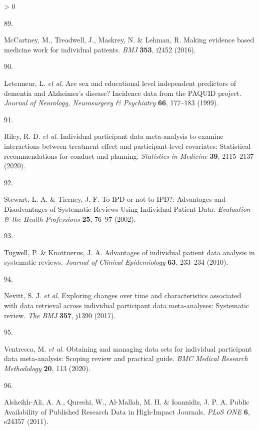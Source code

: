 \documentclass[a4paper, twoside]{templates/ociamthesis}
\newlength{\cslhangindent}
\newlength{\csllabelwidth}
\newenvironment{CSLReferences}[3] %
 {%
  \setlength{\parindent}{0pt}
  \ifodd #1 \everypar{\setlength{\hangindent}{\cslhangindent}}\ignorespaces\fi
  \ifnum #2 > 0
  \setlength{\parskip}{#2\baselineskip}
  \fi
 }%
 {}
\newcommand{\CSLLeftMargin}[1]{\parbox[t]{\maxof{\widthof{#1}}{\csllabelwidth}}{#1}}
\newcommand{\CSLRightInline}[1]{\parbox[t]{\linewidth - \csllabelwidth}{#1}}
\begin{document}
\begin{CSLReferences}{0}{0}
\leavevmode\hypertarget{ref-mccartney2016}{}%
\CSLLeftMargin{89. }
\CSLRightInline{McCartney, M., Treadwell, J., Maskrey, N. \& Lehman, R. Making evidence based medicine work for individual patients. \emph{BMJ} \textbf{353}, i2452 (2016).}

\leavevmode\hypertarget{ref-letenneur1999}{}%
\CSLLeftMargin{90. }
\CSLRightInline{Letenneur, L. \emph{et al.} Are sex and educational level independent predictors of dementia and {Alzheimer}'s disease? Incidence data from the {PAQUID} project. \emph{Journal of Neurology, Neurosurgery \& Psychiatry} \textbf{66}, 177--183 (1999).}

\leavevmode\hypertarget{ref-riley2020}{}%
\CSLLeftMargin{91. }
\CSLRightInline{Riley, R. D. \emph{et al.} Individual participant data meta-analysis to examine interactions between treatment effect and participant-level covariates: Statistical recommendations for conduct and planning. \emph{Statistics in Medicine} \textbf{39}, 2115--2137 (2020).}

\leavevmode\hypertarget{ref-stewart2002}{}%
\CSLLeftMargin{92. }
\CSLRightInline{Stewart, L. A. \& Tierney, J. F. To {IPD} or not to {IPD}?: Advantages and {Disadvantages} of {Systematic Reviews Using Individual Patient Data}. \emph{Evaluation \& the Health Professions} \textbf{25}, 76--97 (2002).}

\leavevmode\hypertarget{ref-tugwell2010}{}%
\CSLLeftMargin{93. }
\CSLRightInline{Tugwell, P. \& Knottnerus, J. A. Advantages of individual patient data analysis in systematic reviews. \emph{Journal of Clinical Epidemiology} \textbf{63}, 233--234 (2010).}

\leavevmode\hypertarget{ref-nevitt2017a}{}%
\CSLLeftMargin{94. }
\CSLRightInline{Nevitt, S. J. \emph{et al.} Exploring changes over time and characteristics associated with data retrieval across individual participant data meta-analyses: Systematic review. \emph{The BMJ} \textbf{357}, j1390 (2017).}

\leavevmode\hypertarget{ref-ventresca2020}{}%
\CSLLeftMargin{95. }
\CSLRightInline{Ventresca, M. \emph{et al.} Obtaining and managing data sets for individual participant data meta-analysis: Scoping review and practical guide. \emph{BMC Medical Research Methodology} \textbf{20}, 113 (2020).}

\leavevmode\hypertarget{ref-alsheikh-ali2011}{}%
\CSLLeftMargin{96. }
\CSLRightInline{Alsheikh-Ali, A. A., Qureshi, W., Al-Mallah, M. H. \& Ioannidis, J. P. A. Public {Availability} of {Published Research Data} in {High}-{Impact Journals}. \emph{PLoS ONE} \textbf{6}, e24357 (2011).}


\end{CSLReferences}
\end{document}
